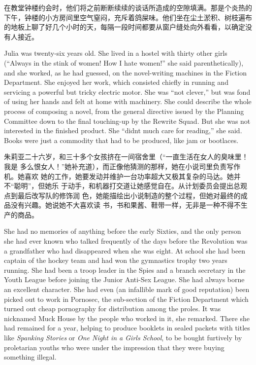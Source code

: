 \begin{paracol}{2}
\switchcolumn

在教堂钟楼约会时，他们将之前断断续续的谈话所造成的空隙填满。那是个炎热的下午，钟楼的小方房间里空气窒闷，充斥着鸽屎味。他们坐在尘土淤积、树枝遍布的地板上聊了好几个小时的天，每隔一段时间都要从窗户缝处向外看看，以确定没有人接近。

\switchcolumn*

Julia was twenty-six years old. She lived in a hostel with thirty other
girls (``Always in the stink of women! How I hate women!'' she said
parenthetically), and she worked, as he had guessed, on the
novel-writing machines in the Fiction Department. She enjoyed her work,
which consisted chiefly in running and servicing a powerful but tricky
electric motor. She was ``not clever,'' but was fond of using her hands
and felt at home with machinery. She could describe the whole process of
composing a novel, from the general directive issued by the Planning
Committee down to the final touching-up by the Rewrite Squad. But she
was not interested in the finished product. She ``didn\textquotesingle t
much care for reading,'' she said. Books were just a commodity that had
to be produced, like jam or bootlaces.

\switchcolumn

朱莉亚二十六岁，和三十多个女孩挤在一间宿舍里（``一直生活在女人的臭味里！我是
多么恨女人！''她补充道），而正像他猜测的那样，她在小说司里负责写作机。她喜欢
她的工作，她要发动并维护一台功率超大又极其复杂的马达。她并不``聪明''，但她乐
于动手，和机器打交道让她感觉自在。从计划委员会提出总观点到最后改写队的修饰润
色，她能描绘出小说制造的整个过程，但她对最终的成品没有兴趣。她说她不大喜欢读
书，书和果酱、鞋带一样，无非是一种不得不生产的商品。

\switchcolumn*

She had no memories of anything before the early Sixties, and the only
person she had ever known who talked frequently of the days before the
Revolution was a grandfather who had disappeared when she was eight. At
school she had been captain of the hockey team and had won the
gymnastics trophy two years running. She had been a troop leader in the
Spies and a branch secretary in the Youth League before joining the
Junior Anti-Sex League. She had always borne an excellent character. She
had even (an infallible mark of good reputation) been picked out to work
in Pornosec, the sub-section of the Fiction Department which turned out
cheap pornography for distribution among the proles. It was nicknamed
Muck House by the people who worked in it, she remarked. There she had
remained for a year, helping to produce booklets in sealed packets with
titles like \emph{Spanking Stories} or \emph{One Night in a
Girls\textquotesingle{} School}, to be bought furtively by proletarian
youths who were under the impression that they were buying something
illegal.


\end{paracol}
